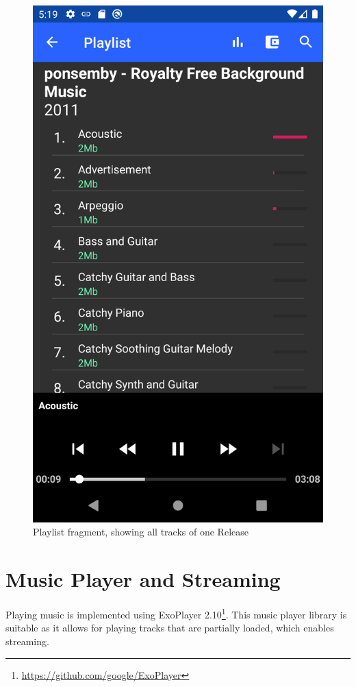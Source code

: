 \begin{figure}
        \includegraphics[width=1\linewidth]{implementation/screenshot-playlist.png}
        \caption{Playlist fragment, showing all tracks of one Release}
        \label{fig:screenshot-playlist}
    \endminipage\hfill
\end{figure}

\section{Music Player and Streaming}
Playing music is implemented using ExoPlayer 2.10\footnote{\url{https://github.com/google/ExoPlayer}}. This music player library is suitable as it allows for playing tracks that are partially loaded, which enables streaming.
